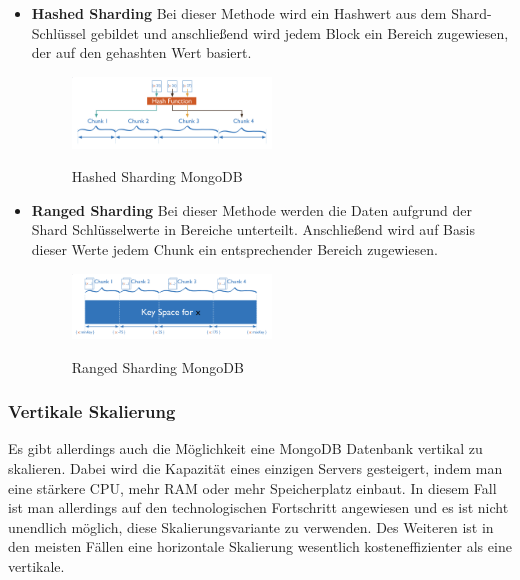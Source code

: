 \begin{itemize}
    \item \textbf{Hashed Sharding}
        \newline
        Bei dieser Methode wird ein Hashwert aus dem Shard-Schlüssel gebildet und anschließend wird jedem Block ein Bereich zugewiesen, der auf den gehashten Wert basiert.
        \begin{figure}[h!]
            \centering
            \includegraphics[width=0.5\textwidth]{pics/hashed_sharding.png}
            \caption{Hashed Sharding MongoDB}
            \cite{hashed_sharding_image}
            \label{fig:enter-label}
        \end{figure}
    \item \textbf{Ranged Sharding}
        \newline
        Bei dieser Methode werden die Daten aufgrund der Shard Schlüsselwerte in Bereiche unterteilt. Anschließend wird auf Basis dieser Werte jedem Chunk ein entsprechender Bereich zugewiesen.
        \begin{figure}[h!]
            \centering
            \includegraphics[width=0.5\textwidth]{pics/ranged_sharding.png}
            \caption{Ranged Sharding MongoDB}
            \cite{range_sharding_image}
            \label{fig:enter-label}
        \end{figure}
\end{itemize}

\subsubsection{Vertikale Skalierung}
Es gibt allerdings auch die Möglichkeit eine MongoDB Datenbank vertikal zu skalieren. Dabei wird die Kapazität eines einzigen Servers gesteigert, indem man eine stärkere CPU, mehr RAM oder mehr Speicherplatz einbaut. In diesem Fall ist man allerdings auf den technologischen Fortschritt angewiesen und es ist nicht unendlich möglich, diese Skalierungsvariante zu verwenden. Des Weiteren ist in den meisten Fällen eine horizontale Skalierung wesentlich kosteneffizienter als eine vertikale.
\cite{mongodb_sharding}

